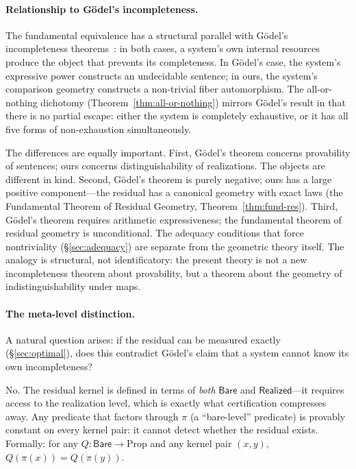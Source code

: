 \documentclass[11pt,a4paper]{article}
\theoremstyle{plain}
\theoremstyle{definition}
\theoremstyle{remark}
\newcommand{\Bare}{\mathsf{Bare}}
\newcommand{\Real}{\mathsf{Realized}}
\newcommand{\compare}{\pi}
\begin{document}
\paragraph{Relationship to Gödel's incompleteness.}
The fundamental equivalence has a structural parallel with Gödel's
incompleteness theorems~\cite{Godel1931}: in both cases, a system's own internal resources
produce the object that prevents its completeness. In Gödel's case, the
system's expressive power constructs an undecidable sentence; in ours, the
system's comparison geometry constructs a non-trivial fiber automorphism.
The all-or-nothing dichotomy (Theorem~\ref{thm:all-or-nothing}) mirrors
Gödel's result in that there is no partial escape: either the system is
completely exhaustive, or it has all five forms of non-exhaustion
simultaneously.

The differences are equally important. First, Gödel's theorem concerns
provability of sentences; ours concerns distinguishability of realizations.
The objects are different in kind. Second, Gödel's theorem is purely
negative; ours has a large positive component---the residual has a canonical
geometry with exact laws (the Fundamental Theorem of Residual Geometry,
Theorem~\ref{thm:fund-res}). Third, Gödel's theorem requires arithmetic
expressiveness; the fundamental theorem of residual geometry is
unconditional. The adequacy conditions that force nontriviality
(\S\ref{sec:adequacy}) are separate from the geometric theory itself.
The analogy is structural, not identificatory: the present theory is not a
new incompleteness theorem about provability, but a theorem about the
geometry of indistinguishability under maps.

\paragraph{The meta-level distinction.}
A natural question arises: if the residual can be measured exactly
(\S\ref{sec:optimal}), does this contradict Gödel's claim that a system
cannot know its own incompleteness?

No. The residual kernel is defined in terms of \emph{both} $\Bare$ and
$\Real$---it requires access to the realization level, which is exactly
what certification compresses away. Any predicate that factors through
$\compare$ (a ``bare-level'' predicate) is provably constant on every
kernel pair: it cannot detect whether the residual exists. Formally:
for any $Q : \Bare \to \mathrm{Prop}$ and any kernel pair $(x,y)$,
$Q(\compare(x)) = Q(\compare(y))$.
\end{document}
